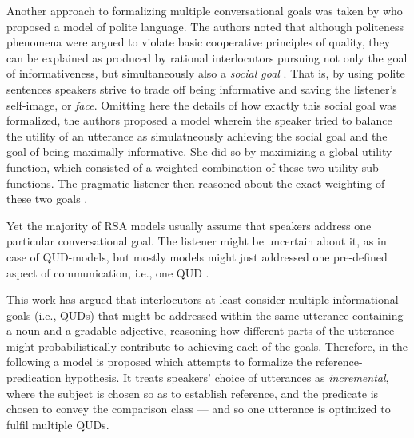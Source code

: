 Another approach to formalizing multiple conversational goals was taken by \textcite{yoon2016talking} who proposed a model of polite language. The authors noted that although politeness phenomena were argued to violate basic cooperative principles of quality, they can be explained as produced by rational interlocutors pursuing not only the goal of informativeness, but simultaneously also a \emph{social goal} \parencite[cf.][]{brown1987politeness, yoon2016talking}. That is, by using polite sentences speakers strive to trade off being informative and saving the listener's self-image, or \emph{face}. Omitting here the details of how exactly this social goal was formalized, the authors proposed a model wherein the speaker tried to balance the utility of an utterance as simulatneously achieving the social goal and the goal of being maximally informative. She did so by maximizing a global utility function, which consisted of a weighted combination of these two utility sub-functions. The pragmatic listener then reasoned about the exact weighting of these two goals \parencite{yoon2016talking}. 

Yet the majority of RSA models usually assume that speakers address one particular conversational goal. The listener might be uncertain about it, as in case of QUD-models, but mostly models might just addressed one pre-defined aspect of communication, i.e., one QUD \parencite[see][for an excellent overview of various RSA models]{problang}. 

This work has argued that interlocutors at least consider multiple informational goals (i.e., QUDs) that might be addressed within the same utterance containing a noun and a gradable adjective, reasoning how different parts of the utterance might probabilistically contribute to achieving each of the goals. Therefore, in the following a model is proposed which attempts to formalize the reference-predication hypothesis. It treats speakers' choice of utterances as \emph{incremental}, where the subject is chosen so as to establish reference, and the predicate is chosen to convey the comparison class --- and so one utterance is optimized to fulfil multiple QUDs. 

